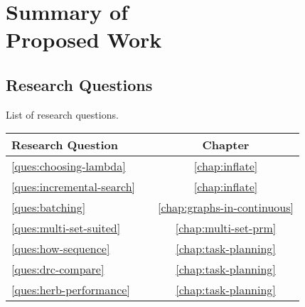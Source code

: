 \chapter[Summary of Proposed Work]{Summary of\\Proposed Work}

\section{Research Questions}
\label{sec:research-questions}

List of research questions.

\begin{center}
\begin{tabular}{llc}
\toprule
   \multicolumn{2}{l}{Research Question}
      & Chapter \\
\midrule
   \ref{ques:choosing-lambda}
      &
      \begin{minipage}[c]{0.8\columnwidth}%
      \nameref{ques:choosing-lambda}
      \end{minipage}%
      & \ref{chap:inflate} \\[10pt]
   \ref{ques:incremental-search}
      &
      \begin{minipage}[c]{0.8\columnwidth}%
      \nameref{ques:incremental-search}
      \end{minipage}%
      & \ref{chap:inflate} \\[10pt]
   \ref{ques:batching}
      &
      \begin{minipage}[c]{0.8\columnwidth}%
      \nameref{ques:batching}
      \end{minipage}%
      & \ref{chap:graphs-in-continuous} \\[10pt]
   \ref{ques:multi-set-suited}
      &
      \begin{minipage}[c]{0.8\columnwidth}%
      \nameref{ques:multi-set-suited}
      \end{minipage}%
      & \ref{chap:multi-set-prm} \\[10pt]
   \ref{ques:how-sequence}
      &
      \begin{minipage}[c]{0.8\columnwidth}%
      \nameref{ques:how-sequence}
      \end{minipage}%
      & \ref{chap:task-planning} \\[10pt]
   \ref{ques:drc-compare}
      &
      \begin{minipage}[c]{0.8\columnwidth}%
      \nameref{ques:drc-compare}
      \end{minipage}%
      & \ref{chap:task-planning} \\[10pt]
   \ref{ques:herb-performance}
      &
      \begin{minipage}[c]{0.8\columnwidth}%
      \nameref{ques:herb-performance}
      \end{minipage}%
      & \ref{chap:task-planning} \\[6pt]
\bottomrule
\end{tabular}
\end{center}

